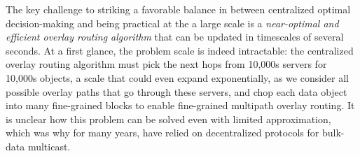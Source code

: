
The key challenge to striking a favorable balance in \name between 
centralized optimal decision-making and being practical at the
a large scale is a {\em near-optimal and efficient overlay routing
algorithm} that can be updated in timescales of several seconds. 
At a first glance, the problem scale is indeed intractable: 
the centralized overlay routing algorithm must pick the next hops
from 10,000s servers for 10,000s objects, a scale that could 
even expand exponentially, as we consider all possible 
overlay paths that go through these servers, and chop each data 
object into many fine-grained blocks to enable fine-grained 
multipath overlay routing.
It is unclear how this problem can be solved even with 
limited approximation, which was why for many years, \company have
relied on decentralized protocols for bulk-data multicast.


